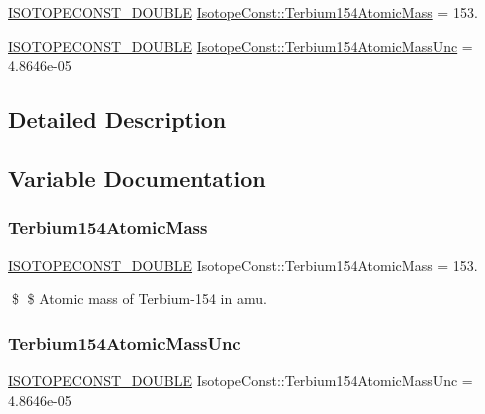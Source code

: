 \begin{DoxyCompactItemize}
\item 
\mbox{\hyperlink{group___isotope_const-_macros_ga8f45a7272ce02c0b4c65c44636ed719a}{I\+S\+O\+T\+O\+P\+E\+C\+O\+N\+S\+T\+\_\+\+D\+O\+U\+B\+LE}} \mbox{\hyperlink{group___isotope_const-_terbium-_tb154_ga5431e0b496883c264930e4ad80872386}{Isotope\+Const\+::\+Terbium154\+Atomic\+Mass}} = 153.
\item 
\mbox{\hyperlink{group___isotope_const-_macros_ga8f45a7272ce02c0b4c65c44636ed719a}{I\+S\+O\+T\+O\+P\+E\+C\+O\+N\+S\+T\+\_\+\+D\+O\+U\+B\+LE}} \mbox{\hyperlink{group___isotope_const-_terbium-_tb154_gac880a47545155473195c2d3e82e51b18}{Isotope\+Const\+::\+Terbium154\+Atomic\+Mass\+Unc}} = 4.\+8646e-\/05
\end{DoxyCompactItemize}


\subsection{Detailed Description}


\subsection{Variable Documentation}
\mbox{\label{group___isotope_const-_terbium-_tb154_ga5431e0b496883c264930e4ad80872386}} 
\subsubsection{\texorpdfstring{Terbium154\+Atomic\+Mass}{Terbium154AtomicMass}}
{\footnotesize\ttfamily \mbox{\hyperlink{group___isotope_const-_macros_ga8f45a7272ce02c0b4c65c44636ed719a}{I\+S\+O\+T\+O\+P\+E\+C\+O\+N\+S\+T\+\_\+\+D\+O\+U\+B\+LE}} Isotope\+Const\+::\+Terbium154\+Atomic\+Mass = 153.}

\$ \$ Atomic mass of Terbium-\/154 in amu. \mbox{\label{group___isotope_const-_terbium-_tb154_gac880a47545155473195c2d3e82e51b18}} 
\subsubsection{\texorpdfstring{Terbium154\+Atomic\+Mass\+Unc}{Terbium154AtomicMassUnc}}
{\footnotesize\ttfamily \mbox{\hyperlink{group___isotope_const-_macros_ga8f45a7272ce02c0b4c65c44636ed719a}{I\+S\+O\+T\+O\+P\+E\+C\+O\+N\+S\+T\+\_\+\+D\+O\+U\+B\+LE}} Isotope\+Const\+::\+Terbium154\+Atomic\+Mass\+Unc = 4.\+8646e-\/05}

